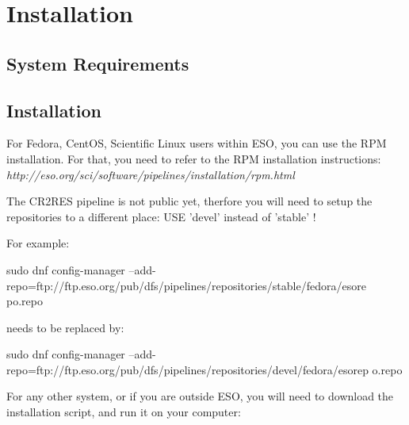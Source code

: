 \section{Installation}
\label{sec:installation}


\subsection{System Requirements}
\label{sec:platforms}

\subsection{Installation}
\label{sec:install-howto}

For Fedora, CentOS, Scientific Linux users within ESO, you can use the RPM
installation.
For that, you need to refer to the RPM installation instructions:
{\it http://eso.org/sci/software/pipelines/installation/rpm.html}

The CR2RES pipeline is not public yet, therfore you will need to setup the
repositories to a different place:
USE 'devel' instead of 'stable' !

For example:

sudo dnf config-manager
--add-repo=ftp://ftp.eso.org/pub/dfs/pipelines/repositories/stable/fedora/esore
po.repo

needs to be replaced by:

sudo dnf config-manager
--add-repo=ftp://ftp.eso.org/pub/dfs/pipelines/repositories/devel/fedora/esorep
o.repo

For any other system, or if you are outside ESO, you will need to download the
installation script, and run it on your computer:

